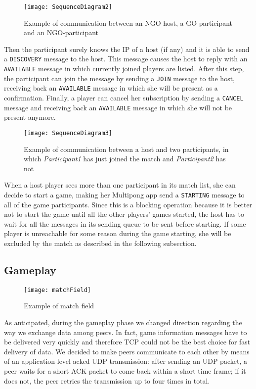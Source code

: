 \begin{figure}[h]
    \centering
    \texttt{[image: SequenceDiagram2]}
    \caption{Example of communication between an NGO-host, a GO-participant
     and an NGO-participant}
    \label{fig:seqDiagram2}
\end{figure}

Then the participant surely knows the IP of a host (if any) and it is able to
send a \texttt{DISCOVERY} message to the host. This message causes the host to
reply with an \texttt{AVAILABLE} message in which currently joined players are
listed. After this step, the participant can join the message by sending a
\texttt{JOIN} message to the host, receiving back an \texttt{AVAILABLE} message
in which she will be present as a confirmation. Finally, a player can cancel
her subscription by sending a \texttt{CANCEL} message and receiving back an
\texttt{AVAILABLE} message in which she will not be present anymore.

\begin{figure}[h]
    \centering
    \texttt{[image: SequenceDiagram3]}
    \caption{Example of communication between a host and two participants,
     in which \emph{Participant1} has just joined the match and
     \emph{Participant2} has not}
    \label{fig:seqDiagram3}
\end{figure}

When a host player sees more than one participant in its match list, she can
decide to start a game, making her Multipong app send a \texttt{STARTING}
message to all of the game participants. Since this is a blocking operation
because it is better not to start the game until all the other players' games
started, the host has to wait for all the messages in its sending queue to be
sent before starting. If some player is unreachable for some reason
during the game starting, she will be excluded by the match as described in
the following subsection.



\subsection{Gameplay}

\begin{figure}[H]
    \centering
    \texttt{[image: matchField]}
    \caption{Example of match field}
    \label{fig:matchField}
\end{figure}

As anticipated, during the gameplay phase we changed direction regarding the
way we exchange data among peers. In fact, game information messages have to
be delivered very quickly and therefore TCP could not be the best choice for
fast delivery of data. We decided to make peers communicate to each other by
means of an application-level acked UDP transmission: after sending an UDP
packet, a peer waits for a short ACK packet to come back within a short time
frame; if it does not, the peer retries the transmission up to four times in
total.

